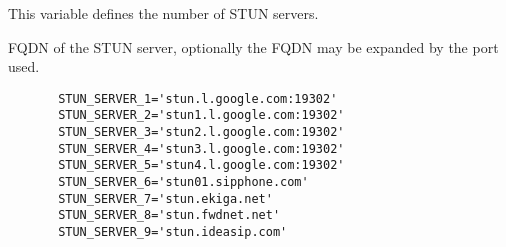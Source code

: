 \begin{description}

This variable defines the number of STUN servers.


FQDN of the STUN server, optionally the FQDN may be expanded by the port used.

\begin{example}
\begin{verbatim}
       STUN_SERVER_1='stun.l.google.com:19302'
       STUN_SERVER_2='stun1.l.google.com:19302'
       STUN_SERVER_3='stun2.l.google.com:19302'
       STUN_SERVER_4='stun3.l.google.com:19302'
       STUN_SERVER_5='stun4.l.google.com:19302'
       STUN_SERVER_6='stun01.sipphone.com'
       STUN_SERVER_7='stun.ekiga.net'
       STUN_SERVER_8='stun.fwdnet.net'
       STUN_SERVER_9='stun.ideasip.com' 
\end{verbatim}
\end{example}

\end{description}

